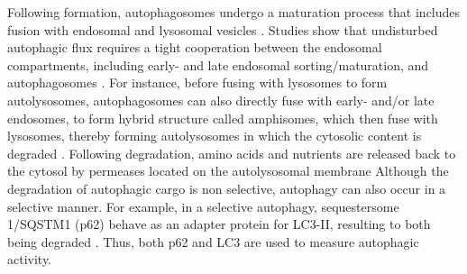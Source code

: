 Following formation, autophagosomes undergo a maturation process that includes fusion with endosomal and lysosomal vesicles \citep{Eskelinen2005}. Studies show that undisturbed autophagic flux requires a tight cooperation between the endosomal compartments, including early- and late endosomal sorting/maturation, and autophagosomes \citep{Eskelinen2005}. For instance, before fusing with lysosomes to form autolysosomes, autophagosomes can also directly fuse with early- and/or late endosomes, to form hybrid structure called amphisomes, which then fuse with lysosomes, thereby forming autolysosomes in which the cytosolic content is degraded \citep{Bell2006,Filimonenko2007,Liou1997}. Following degradation, amino acids and nutrients are released back to the cytosol by permeases located on the autolysosomal membrane \citep{Loos2013} Although the degradation of autophagic cargo is non selective, autophagy can also occur in a selective manner. For example, in a selective autophagy, sequestersome 1/SQSTM1 (p62) behave as an adapter protein for LC3-II, resulting to both being degraded \citep{Klionsky2005,Singh2011}. Thus, both p62 and LC3 are used to measure autophagic activity. 

